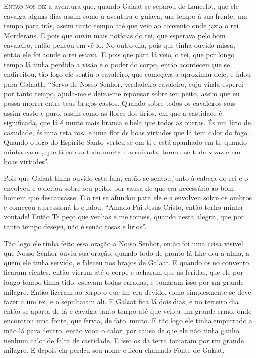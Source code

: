 \textsc{Então nos diz} a aventura que, quando Galaat se separou de Lancelot, que ele
cavalga alguns dias assim como a aventura o guiava, um tempo à sua frente, um
tempo para trás, assim tanto tempo até que veio ao convento onde jazia o rei
Morderans. E pois que ouviu mais notícias do rei, que esperava pelo bom
cavaleiro, então pensou em vê-lo. No outro dia, pois que tinha ouvido missa,
então ele foi aonde o rei estava. E pois que para lá veio, o rei, que por longo
tempo lá tinha perdido a visão e o poder do corpo, então aconteceu que se
endireitou, tão logo ele sentiu o cavaleiro, que começava a aproximar dele, e
falou para Galaath: “Servo de Nosso Senhor, verdadeiro cavaleiro, cuja vinda
esperei por tanto tempo, ajuda-me e deixa-me repousar sobre teu peito, assim
que eu possa morrer entre teus braços castos. Quando sobre todos os cavaleiros
sois assim casto e puro, assim como as flores dos lírios, em que a castidade é
significada, que lá é muito mais branca e bela que todas as outras. És um lírio
de castidade, és uma reta rosa e uma flor de boas virtudes que lá tem calor do
fogo. Quando o fogo do Espírito Santo verteu-se em ti e está apanhado em ti;
quando minha carne, que lá estava toda morta e arruinada, tornou-se toda vivaz
e em boas virtudes”.

Pois que Galaat tinha ouvido esta fala, então se sentou junto à cabeça do rei e
o envolveu e o deitou sobre seu peito, por causa de que era necessário ao bom
homem que descansasse. E o rei se afundou para ele e o envolveu sobre os ombros
e começou a pressioná-lo e falou: “Amado Pai Jesus Cristo, então tenho minha
vontade! Então Te peço que venhas e me tomeis, quando nesta alegria, que por
tanto tempo desejei, não é senão rosas e lírios”. 

Tão logo ele tinha feito essa oração a Nosso Senhor, então foi uma coisa visível
que Nosso Senhor ouviu sua oração, quando todo de pronto lá Lhe deu a alma, a
quem ele tinha servido, e faleceu nos braços de Galaat. E quando os no convento
ficaram cientes, então vieram até o corpo e acharam que as feridas, que ele por
longo tempo tinha tido, estavam todas curadas, e tomaram isso por um grande
milagre. Então fizeram ao corpo o que lhe era devido, como simplesmente se deve
fazer a um rei, e o sepultaram ali. E Galaat fica lá dois dias, e no
terceiro dia então se aparta de lá e cavalga tanto tempo até que veio a um
grande ermo, onde encontrou uma fonte, que fervia, de fato, muito. E tão logo
ele tinha empurrado a mão lá para dentro, então voou o calor, por causa de que
ele não tinha ganho nenhum calor de falta de castidade. E isso os da terra
tomaram por um grande milagre. E depois ela perdeu seu nome e ficou chamada
Fonte de Galaat. 

